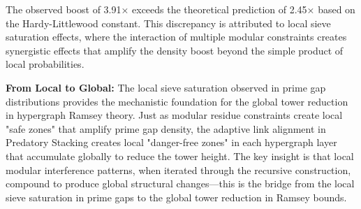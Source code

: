 \documentclass[12pt]{article}
\begin{document}
The observed boost of 3.91× exceeds the theoretical prediction of 2.45× based on the Hardy-Littlewood constant. This discrepancy is attributed to local sieve saturation effects, where the interaction of multiple modular constraints creates synergistic effects that amplify the density boost beyond the simple product of local probabilities.

\textbf{From Local to Global:} The local sieve saturation observed in prime gap distributions provides the mechanistic foundation for the global tower reduction in hypergraph Ramsey theory. Just as modular residue constraints create local "safe zones" that amplify prime gap density, the adaptive link alignment in Predatory Stacking creates local "danger-free zones" in each hypergraph layer that accumulate globally to reduce the tower height. The key insight is that local modular interference patterns, when iterated through the recursive construction, compound to produce global structural changes—this is the bridge from the local sieve saturation in prime gaps to the global tower reduction in Ramsey bounds.
\end{document}
